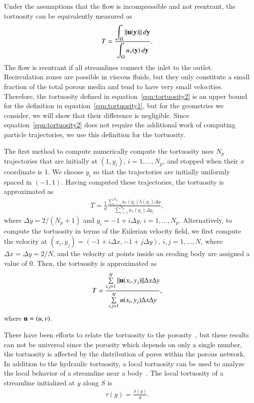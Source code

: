 \documentclass[preprint, 10pt]{elsarticle}
\begin{document}
Under the assumptions that the flow is incompressible and not reentrant,
the tortuosity can be equivalently measured as~\cite{dud-koz-mat2011}
\begin{align}
  T = \frac{\displaystyle\int_\Omega \|{\mathbf{u}}({\mathbf{y}})\|\, d{\mathbf{y}}}
           {\displaystyle\int_\Omega u_x({\mathbf{y}})\, d{\mathbf{y}}}.
  \label{eqn:tortuosity2}
\end{align}
The flow is reentrant if all streamlines connect the inlet to the
outlet.  Recirculation zones are possible in viscous fluids, but they
only constitute a small fraction of the total porous media and tend to
have very small velocities.  Therefore, the tortuosity defined in
equation~\eqref{eqn:tortuosity2} is an upper bound for the definition in
equation~\eqref{eqn:tortuosity1}, but for the geometries we consider, we
will show that their difference is negligible.  Since
equation~\eqref{eqn:tortuosity2} does not require the additional work of
computing particle trajectories, we use this definition for the
tortuosity.

The first method to compute numerically compute the tortuosity uses
$N_p$ trajectories that are initially at $(1,y_i)$, $i=1,\ldots,N_p$,
and stopped when their $x$ coordinate is 1.  We choose $y_i$ so that the
trajectories are initially uniformly spaced in $(-1,1)$.  Having
computed these trajectories, the tortuosity is approximated as
\begin{align}
  T = \frac{1}{d}\frac{\displaystyle\sum_{i=1}^{N_p} 
    u_x(y_i) \lambda(y_i) \Delta y}
  {\displaystyle\sum_{i=1}^{N_p} u_x(y_i) \Delta y_i}, 
\end{align}
where $\Delta y = 2/(N_p + 1)$ and $y_i = -1 + i \Delta y$,
$i=1,\ldots,N_p$.  Alternatively, to compute the tortuosity in terms of
the Eulerian velocity field, we first compute the velocity at $(x_i,y_j)
= (-1 + i\Delta x, -1 + j\Delta y)$, $i,j=1,\ldots,N$, where $\Delta x =
\Delta y = 2/N$, and the velocity at points inside an eroding body are
assigned a value of 0.  Then, the tortuosity is approximated as
\begin{align}
  T = \frac{\sum\limits_{i,j=1}^N \|{\mathbf{u}}(x_i,y_j)\|\Delta x \Delta y}
      {\sum\limits_{i,j=1}^N u(x_i,y_j) \Delta x \Delta y},
\end{align}
where ${\mathbf{u}} = (u,v)$.

There have been efforts to relate the tortuosity to the
porosity~\cite{matyka2008tortuosity}, but these results can not be
universal since the porosity which depends on only a single number, the
tortuosity is affected by the distribution of pores within the porous
network.  In addition to the hydraulic tortuosity, a local tortuosity
can be used to analyze the local behavior of a streamline near a
body~\cite{matyka2008tortuosity}.  The local tortuosity of a streamline
initialized at $y$ along $S$ is
\begin{align*}
  \tau(y) = \frac{\lambda(y)}{d}.
\end{align*}
\end{document}
